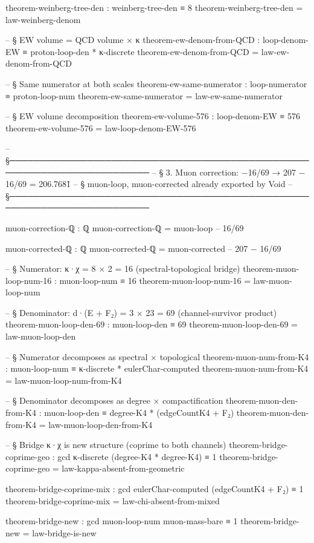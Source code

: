 \documentclass[11pt,a4paper]{book}
\begin{document}
\begin{code}
theorem-weinberg-tree-den : weinberg-tree-den ≡ 8
theorem-weinberg-tree-den = law-weinberg-denom

-- § EW volume = QCD volume × κ
theorem-ew-denom-from-QCD : loop-denom-EW ≡ proton-loop-den * κ-discrete
theorem-ew-denom-from-QCD = law-ew-denom-from-QCD

-- § Same numerator at both scales
theorem-ew-same-numerator : loop-numerator ≡ proton-loop-num
theorem-ew-same-numerator = law-ew-same-numerator

-- § EW volume decomposition
theorem-ew-volume-576 : loop-denom-EW ≡ 576
theorem-ew-volume-576 = law-loop-denom-EW-576

-- §──────────────────────────────────────────────────────────────────────────
-- § 3. Muon correction: −16/69 → 207 − 16/69 = 206.7681̄
-- §    muon-loop, muon-corrected already exported by Void
-- §──────────────────────────────────────────────────────────────────────────

muon-correction-ℚ : ℚ
muon-correction-ℚ = muon-loop             -- 16/69

muon-corrected-ℚ : ℚ
muon-corrected-ℚ = muon-corrected         -- 207 − 16/69

-- § Numerator: κ·χ = 8 × 2 = 16 (spectral-topological bridge)
theorem-muon-loop-num-16 : muon-loop-num ≡ 16
theorem-muon-loop-num-16 = law-muon-loop-num

-- § Denominator: d·(E + F₂) = 3 × 23 = 69 (channel-survivor product)
theorem-muon-loop-den-69 : muon-loop-den ≡ 69
theorem-muon-loop-den-69 = law-muon-loop-den

-- § Numerator decomposes as spectral × topological
theorem-muon-num-from-K4 : muon-loop-num ≡ κ-discrete * eulerChar-computed
theorem-muon-num-from-K4 = law-muon-loop-num-from-K4

-- § Denominator decomposes as degree × compactification
theorem-muon-den-from-K4 : muon-loop-den ≡ degree-K4 * (edgeCountK4 + F₂)
theorem-muon-den-from-K4 = law-muon-loop-den-from-K4

-- § Bridge κ·χ is new structure (coprime to both channels)
theorem-bridge-coprime-geo : gcd κ-discrete (degree-K4 * degree-K4) ≡ 1
theorem-bridge-coprime-geo = law-kappa-absent-from-geometric

theorem-bridge-coprime-mix : gcd eulerChar-computed (edgeCountK4 + F₂) ≡ 1
theorem-bridge-coprime-mix = law-chi-absent-from-mixed

theorem-bridge-new : gcd muon-loop-num muon-mass-bare ≡ 1
theorem-bridge-new = law-bridge-is-new


\end{code}
\end{document}
